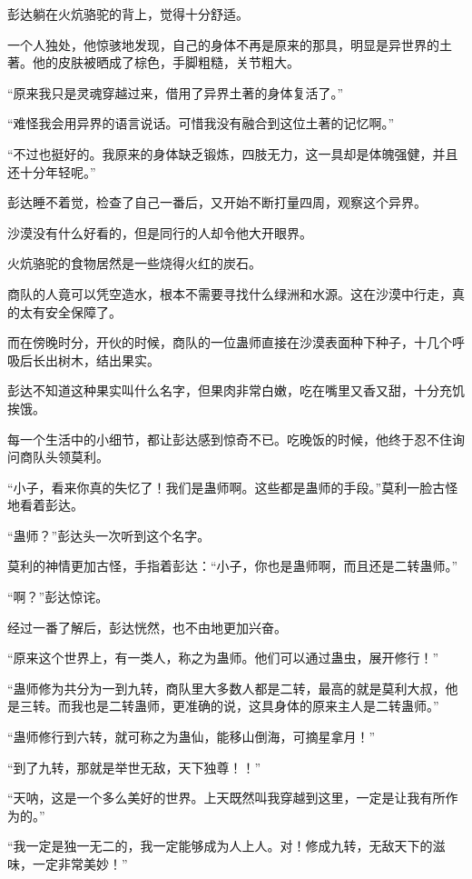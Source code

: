 \begin{this_body}
彭达躺在火炕骆驼的背上，觉得十分舒适。

一个人独处，他惊骇地发现，自己的身体不再是原来的那具，明显是异世界的土著。他的皮肤被晒成了棕色，手脚粗糙，关节粗大。

“原来我只是灵魂穿越过来，借用了异界土著的身体复活了。”

“难怪我会用异界的语言说话。可惜我没有融合到这位土著的记忆啊。”

“不过也挺好的。我原来的身体缺乏锻炼，四肢无力，这一具却是体魄强健，并且还十分年轻呢。”

彭达睡不着觉，检查了自己一番后，又开始不断打量四周，观察这个异界。

沙漠没有什么好看的，但是同行的人却令他大开眼界。

火炕骆驼的食物居然是一些烧得火红的炭石。

商队的人竟可以凭空造水，根本不需要寻找什么绿洲和水源。这在沙漠中行走，真的太有安全保障了。

而在傍晚时分，开伙的时候，商队的一位蛊师直接在沙漠表面种下种子，十几个呼吸后长出树木，结出果实。

彭达不知道这种果实叫什么名字，但果肉非常白嫩，吃在嘴里又香又甜，十分充饥挨饿。

每一个生活中的小细节，都让彭达感到惊奇不已。吃晚饭的时候，他终于忍不住询问商队头领莫利。

“小子，看来你真的失忆了！我们是蛊师啊。这些都是蛊师的手段。”莫利一脸古怪地看着彭达。

“蛊师？”彭达头一次听到这个名字。

莫利的神情更加古怪，手指着彭达：“小子，你也是蛊师啊，而且还是二转蛊师。”

“啊？”彭达惊诧。

经过一番了解后，彭达恍然，也不由地更加兴奋。

“原来这个世界上，有一类人，称之为蛊师。他们可以通过蛊虫，展开修行！”

“蛊师修为共分为一到九转，商队里大多数人都是二转，最高的就是莫利大叔，他是三转。而我也是二转蛊师，更准确的说，这具身体的原来主人是二转蛊师。”

“蛊师修行到六转，就可称之为蛊仙，能移山倒海，可摘星拿月！”

“到了九转，那就是举世无敌，天下独尊！！”

“天呐，这是一个多么美好的世界。上天既然叫我穿越到这里，一定是让我有所作为的。”

“我一定是独一无二的，我一定能够成为人上人。对！修成九转，无敌天下的滋味，一定非常美妙！”


\end{this_body}
